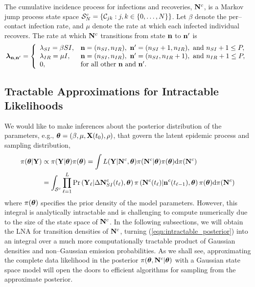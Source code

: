 The cumulative incidence process for infections and recoveries, $ \mathbf{N}^c $, is a Markov jump process state space $ \mathcal{S}_N^c = \left \lbrace \mathcal{C}_{jk}:j,k\in\lbrace0,\dots,N\rbrace\right \rbrace $. Let $ \beta $ denote the per--contact infection rate, and $ \mu $ denote the rate at which each infected individual recovers. The rate at which $ \mathbf{N}^c $ transitions from state $ \mathbf{n} $ to $ \mathbf{n}^{\prime}$ is 
\begin{equation}
	\label{eqn:lna_sir_rates}
	\boldsymbol{\lambda}_{\mathbf{n},\mathbf{n}^\prime} = \left \lbrace \begin{array}{ll}
	\lambda_{SI} = \beta S I, & \mathbf{n} = (n_{SI},n_{IR}),\ \mathbf{n}^\prime = (n_{SI}+1,n_{IR}),\text{ and } n_{SI}+1\leq P, \\
	 \lambda_{IR} = \mu I, &  \mathbf{n} = (n_{SI},n_{IR}),\  \mathbf{n}^\prime = (n_{SI},n_{IR}+1),\text{ and } n_{IR}+1\leq P, \\
	 0, & \text{for all other } \mathbf{n} \text{ and } \mathbf{n}^\prime.
	\end{array} \right.
\end{equation}

\subsection{Tractable Approximations for Intractable Likelihoods}
\label{subsec:lna_motivation}
We would like to make inferences about the posterior distribution of the parameters, e.g., $ \boldsymbol{\theta} = (\beta, \mu, \mathbf{X}(t_0), \rho)$, that govern the latent epidemic process and sampling distribution, 
\begin{align}
\label{eqn:intractable_posterior}
 \pi(\boldsymbol{\theta}|\mathbf{Y})&\propto \pi(\mathbf{Y}|\boldsymbol{\theta})\pi(\boldsymbol{\theta}) = \int L(\mathbf{Y}|\mathbf{N}^c,\boldsymbol{\theta})\pi(\mathbf{N}^c|\boldsymbol{\theta})\pi(\boldsymbol{\theta})\mathrm{d}\pi(\mathbf{N}^c)\nonumber\\
 &= \int_{\mathcal{S}^c}\prod_{\ell=1}^L \Pr\left (\mathbf{Y}_\ell|\Delta\mathbf{N}_{SI}^c(t_\ell),\boldsymbol{\theta}\right )\pi\left (\mathbf{N}^c(t_\ell)|\mathbf{n}^c(t_{\ell-1}),\boldsymbol{\theta}\right )\pi(\boldsymbol{\theta})\mathrm{d}\pi(\mathbf{N}^c)
\end{align}
where $ \pi(\boldsymbol{\theta}) $ specifies the prior density of the model parameters. However, this integral is analytically intractable and is challenging to compute numerically due to the size of the state space of $ \mathbf{N}^c $. In the following subsections, we will obtain the LNA for transition densities of $ \mathbf{N}^c $, turning (\ref{eqn:intractable_posterior}) into an integral over a much more computationally tractable product of Gaussian densities and non--Gaussian emission probabilities. As we shall see, approximating the complete data likelihood in the posterior $ \pi(\boldsymbol{\theta},\mathbf{N}^c|\boldsymbol{\theta}) $ with a Gaussian state space model will open the doors to efficient algorithms for sampling from the approximate posterior. 

